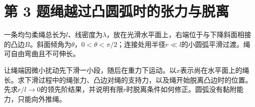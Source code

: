 \documentclass[UTF8,fontset=fandol,a4paper,11pt]{ctexart}
\begin{document}
\clearpage


\section*{第 3 题\quad 绳越过凸圆弧时的张力与脱离}\label{q:3}


一条均匀柔绳总长为$l$、线密度为$\lambda$，放在光滑水平面上，右端位于与下降斜面相接的凸边$B$。斜面倾角为$\theta$，$0<\theta<\pi/2$；连接处用半径$r\ll l$的小圆弧平滑过渡。绳可自由弯曲且不可伸长。

让绳端因微小扰动先下滑一小段，随后在重力下运动。以$x$表示尚在水平面上的绳长。求下滑过程中的绳张力、凸边对绳的支持力，以及绳开始脱离凸边时的位置。先求$r/l\to0$的领先阶结果，并说明有限$r$时脱离条件如何修正。圆弧没有黏附能力，只能向外推绳。
\end{document}
